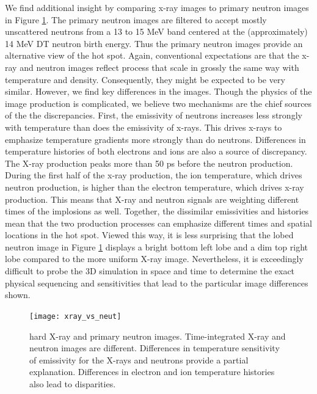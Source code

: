 \documentclass[aip,pop,numerical,reprint,floatfix]{revtex4-1}
\begin{document}
We find additional insight by comparing x-ray images to primary neutron
images in Figure \ref{fig:xray_vs_neuts}. The primary neutron images are
filtered to accept mostly unscattered neutrons from a 13 to 15 MeV
band centered at the (approximately) 14 MeV DT neutron birth energy.
Thus the primary neutron images provide an alternative view of the
hot spot. Again, conventional expectations are that the x-ray and
neutron images reflect process that scale in grossly the same way
with temperature and density. Consequently, they might be expected
to be very similar. However, we find key differences in the images.
Though the physics of the image production is complicated, we believe
two mechanisms are the chief sources of the the discrepancies. First,
the emissivity of neutrons increases less strongly with temperature
than does the emissivity of x-rays. This drives x-rays to emphasize
temperature gradients more strongly than do neutrons. Differences
in temperature histories of both electrons and ions are also a source
of discrepancy. The X-ray production peaks more than 50 ps before
the neutron production. During the first half of the x-ray production,
the ion temperature, which drives neutron production, is higher than
the electron temperature, which drives x-ray production. This means
that X-ray and neutron signals are weighting different times of the
implosions as well. Together, the dissimilar emissivities and histories
mean that the two production processes can emphasize different times
and spatial locations in the hot spot. Viewed this way, it is less
surprising that the lobed neutron image in Figure \ref{fig:xray_vs_neuts}
displays a bright bottom left lobe and a dim top right lobe compared
to the more uniform X-ray image. Nevertheless, it is exceedingly difficult
to probe the 3D simulation in space and time to determine the exact
physical sequencing and sensitivities that lead to the particular
image differences shown. 

\begin{figure}[h]
\begin{centering}
\texttt{[image: xray\_vs\_neut]}
\par\end{centering}
\caption{\label{fig:xray_vs_neuts}hard X-ray and primary neutron images. Time-integrated X-ray and neutron images are different. Differences in temperature sensitivity of emissivity for the X-rays and neutrons provide a partial explanation. Differences in electron and ion temperature histories also lead to disparities.}
\end{figure}
\end{document}
